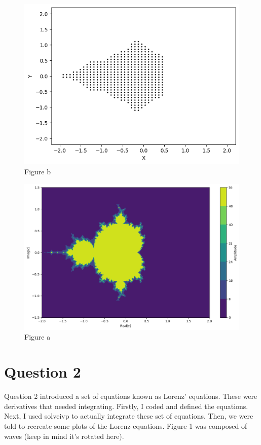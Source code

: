 \documentclass{article}
\begin{document}
\begin{figure}
\includegraphics[width=0.5\linewidth,height=140\texthheight]{plot 1.png} 
\caption{Figure b}
\label{fig:wrapfig}
\end{figure}
\begin{figure}
\includegraphics[width=0.5\linewidth,height=140\texthheight]{Colour scale.png} 

\caption{Figure a}
\label{fig:wrapfig}
\end{figure}

\section{Question 2}

Question 2 introduced a set of equations known as Lorenz' equations. These were derivatives that needed integrating. Firstly, I coded and defined the equations. Next, I used solveivp to actually integrate these set of equations. Then, we were told to recreate some plots of the Lorenz equations.
Figure 1 was composed of waves (keep in mind it's rotated here).
\end{document}
